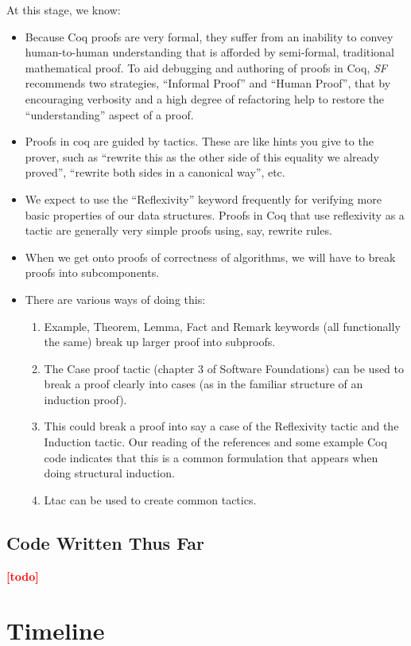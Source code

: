 \documentclass{article}
\newcommand{\todo}[1]{\textcolor{red}{\textbf{\textsf{[#1]}}}}
\begin{document}
At this stage, we know:
\begin{itemize}
\item
  Because Coq proofs are very formal, they suffer from an inability to
  convey human-to-human understanding that is afforded by
  semi-formal, traditional mathematical proof.
  To aid debugging and authoring of proofs in Coq,
  \emph{SF} \cite{sf} recommends two strategies, ``Informal Proof''
  and ``Human Proof'', that by encouraging verbosity and a high degree
  of refactoring
  help to restore the ``understanding'' aspect of a proof.
\item Proofs in coq are guided by tactics. These are like hints you
  give to the prover, such as ``rewrite this as the other side of this
  equality we already proved'', ``rewrite both sides in a canonical
  way'',  etc.
\item We expect to use the ``Reflexivity'' keyword frequently for
  verifying more
  basic properties of our data structures.
  Proofs in Coq that use reflexivity as a tactic are generally very
  simple proofs using, say, rewrite rules.
\item When we get onto proofs of correctness of algorithms, we will
  have to break proofs into subcomponents.
\item There are various ways of doing this:
\begin{enumerate}
\item Example, Theorem, Lemma, Fact and Remark keywords (all
  functionally the same) break up larger proof into subproofs.
\item The Case proof tactic (chapter 3 of Software Foundations) can be
  used to break a proof clearly into cases (as in the familiar
  structure of an induction proof).
\item This could break a proof into say a case of the Reflexivity
  tactic and the Induction tactic.
  Our reading of the references and some example Coq code
  indicates that this is a common formulation that appears
  when doing structural induction.
\item Ltac can be used to create common tactics.
\end{enumerate}

\end{itemize}

\subsection{Code Written Thus Far}
\todo{todo}

\section{Timeline}
\end{document}
